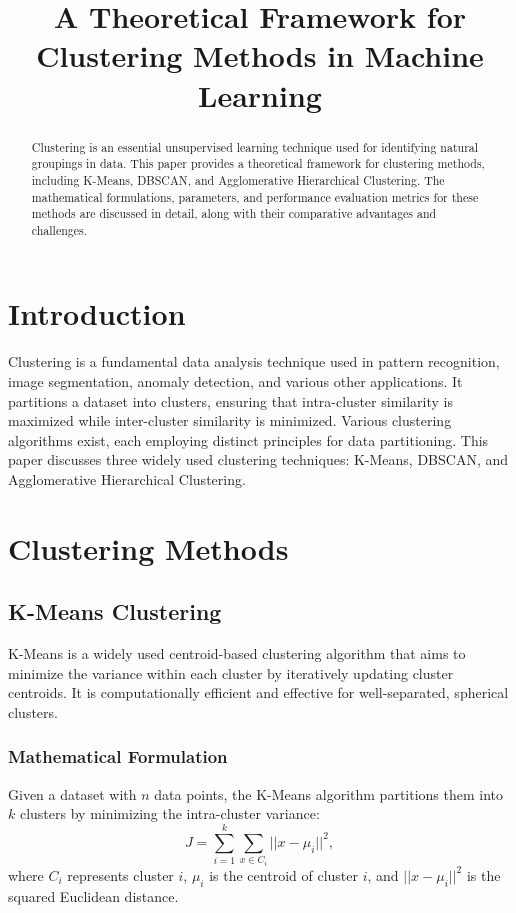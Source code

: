 \documentclass{article}
\title{A Theoretical Framework for Clustering Methods in Machine Learning}
\author{}
\date{}
\begin{document}
\maketitle

\begin{abstract}
Clustering is an essential unsupervised learning technique used for identifying natural groupings in data. This paper provides a theoretical framework for clustering methods, including K-Means, DBSCAN, and Agglomerative Hierarchical Clustering. The mathematical formulations, parameters, and performance evaluation metrics for these methods are discussed in detail, along with their comparative advantages and challenges.
\end{abstract}

\section{Introduction}
Clustering is a fundamental data analysis technique used in pattern recognition, image segmentation, anomaly detection, and various other applications. It partitions a dataset into clusters, ensuring that intra-cluster similarity is maximized while inter-cluster similarity is minimized. Various clustering algorithms exist, each employing distinct principles for data partitioning. This paper discusses three widely used clustering techniques: K-Means, DBSCAN, and Agglomerative Hierarchical Clustering.

\section{Clustering Methods}

\subsection{K-Means Clustering}
K-Means is a widely used centroid-based clustering algorithm that aims to minimize the variance within each cluster by iteratively updating cluster centroids. It is computationally efficient and effective for well-separated, spherical clusters.

\subsubsection{Mathematical Formulation}
Given a dataset with $n$ data points, the K-Means algorithm partitions them into $k$ clusters by minimizing the intra-cluster variance:
\begin{equation}
J = \sum_{i=1}^{k} \sum_{x \in C_i} ||x - \mu_i||^2,
\end{equation}
where $C_i$ represents cluster $i$, $\mu_i$ is the centroid of cluster $i$, and $||x - \mu_i||^2$ is the squared Euclidean distance.
\end{document}
